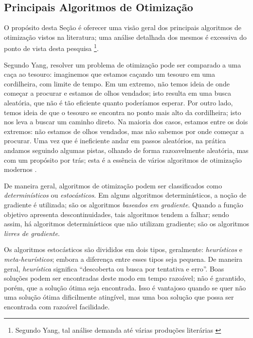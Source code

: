 \subsection{Principais Algoritmos de Otimiza\c{c}\~{a}o}
O prop\'{o}sito desta Se\c{c}\~{a}o \'{e} oferecer uma vis\~{a}o geral dos principais algoritmos de otimiza\c{c}\~{a}o vistos na literatura; uma an\'{a}lise detalhada dos mesmos \'{e} excessiva do ponto de vista desta pesquisa \footnote{Segundo Yang, tal an\'{a}lise demanda at\'{e} v\'{a}rias produ\c{c}\~{o}es liter\'{a}rias \cite{yang}}.

Segundo Yang, resolver um problema de otimiza\c{c}\~{a}o pode ser comparado a uma ca\c{c}a ao tesouro: imaginemos que estamos ca\c{c}ando um tesouro em uma cordilheira, com limite de tempo. Em um extremo, n\~{a}o temos ideia de onde come\c{c}ar a procurar e estamos de olhos vendados; isto resulta em uma busca aleat\'{o}ria, que n\~{a}o \'{e} t\~{a}o eficiente quanto poder\'{i}amos esperar. Por outro lado, temos ideia de que o tesouro se encontra no ponto mais alto da cordilheira; isto nos leva a buscar um caminho direto. Na maioria dos casos, estamos entre os dois extremos: n\~{a}o estamos de olhos vendados, mas n\~{a}o sabemos por onde come\c{c}ar a procurar. Uma vez que \'{e} ineficiente andar em passos aleat\'{o}rios, na pr\'{a}tica andamos seguindo algumas pistas, olhando de forma razoavelmente aleat\'{o}ria, mas com um prop\'{o}sito por tr\'{a}s; esta \'{e} a ess\^{e}ncia de v\'{a}rios algoritmos de otimiza\c{c}\~{a}o modernos \cite{yang}.

De maneira geral, algoritmos de otimiza\c{c}\~{a}o podem ser classificados como \textit{determin\'{i}sticos} ou \textit{estoc\'{a}sticos}. Em alguns algoritmos determin\'{i}sticos, a no\c{c}\~{a}o de gradiente \'{e} utilizada; s\~{a}o os algoritmos \textit{baseados em gradiente}. Quando a fun\c{c}\~{a}o objetivo apresenta descontinuidades, tais algoritmos tendem a falhar; sendo assim, h\'{a} algoritmos determin\'{i}sticos que n\~{a}o utilizam gradiente; s\~{a}o os algoritmos \textit{livres de gradiente}.

Os algoritmos estoc\'{a}sticos s\~{a}o divididos em dois tipos, geralmente: \textit{heur\'{i}sticos} e \textit{meta-heur\'{i}sticos}; embora a diferen\c{c}a entre esses tipos seja pequena. De maneira geral, \textit{heur\'{i}stica} significa ``descoberta ou busca por tentativa e erro''. Boas solu\c{c}\~{o}es podem ser encontradas deste modo em tempo razo\'{a}vel; n\~{a}o \'{e} garantido, por\'{e}m, que a solu\c{c}\~{a}o \'{o}tima seja encontrada. Isso \'{e} vantajoso quando se quer n\~{a}o uma solu\c{c}\~{a}o \'{o}tima dificilmente ating\'{i}vel, mas uma boa solu\c{c}\~{a}o que possa ser encontrada com razo\'{a}vel facilidade.


